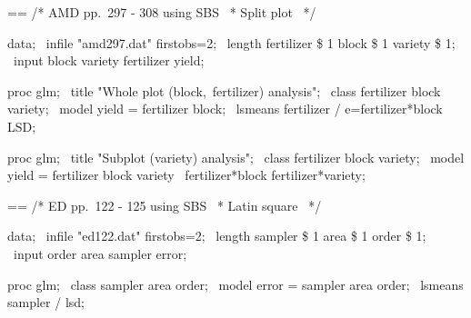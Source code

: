 \documentclass{book}
\makeatletter
\newenvironment{Texinfopreformatted}{%
  \par\GNUTobeylines\obeyspaces\frenchspacing\parskip=\z@\parindent=\z@}{}
{\catcode`\^^M=13 \gdef\GNUTobeylines{\catcode`\^^M=13 \def^^M{\null\par}}}
\newenvironment{Texinfoindented}{\begin{list}{}{}\item\relax}{\end{list}}
\renewcommand{\_}{\Texinfounderscore\discretionary{}{}{}}
\makeatother
\begin{document}
\begin{Texinfoindented}
\begin{Texinfopreformatted}%
\ttfamily 
/* AMD pp.\ 297 - 308 using SBS
\ * Split plot
\ */

data;
\ infile "amd297.dat" firstobs=2;
\ length fertilizer \$ 1 block \$ 1 variety \$ 1;
\ input block variety fertilizer yield;

proc glm;
\ title "Whole plot (block,\ fertilizer) analysis";
\ class fertilizer block variety;
\ model yield = fertilizer block;
\ lsmeans fertilizer / e=fertilizer*block LSD;

proc glm;
\ title "Subplot (variety) analysis";
\ class fertilizer block variety;
\ model yield = fertilizer block variety
\               fertilizer*block fertilizer*variety;


\end{Texinfopreformatted}
\end{Texinfoindented}

\begin{Texinfoindented}
\begin{Texinfopreformatted}%
\ttfamily 
/* ED pp.\ 122 - 125 using SBS
\ * Latin square
\ */

data;
\ infile "ed122.dat" firstobs=2;
\ length sampler \$ 1 area \$ 1 order \$ 1;
\ input order area sampler error;

proc glm;
\ class sampler area order;
\ model error = sampler area order;
\ lsmeans sampler / lsd;

\end{Texinfopreformatted}
\end{Texinfoindented}
\end{document}

